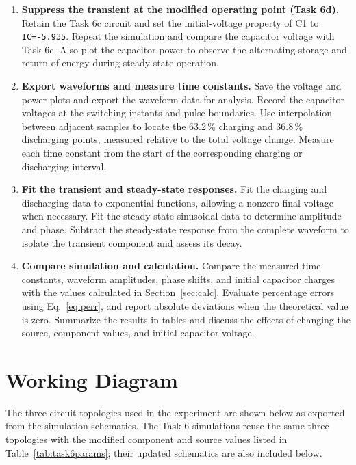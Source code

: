 \documentclass[12pt,a4paper]{article}
\begin{document}
\begin{enumerate}[label=\arabic*., leftmargin=2.5em, itemsep=6pt]
		\item \textbf{Suppress the transient at the modified operating
			point (Task 6d).}
		Retain the Task 6c circuit and set the initial-voltage property
		of C1 to \texttt{IC=-5.935}.  Repeat the simulation and
		compare the capacitor voltage with Task 6c.  Also plot the
		capacitor power to observe the alternating storage and return
		of energy during steady-state operation.
		
		\item \textbf{Export waveforms and measure time constants.}
		Save the voltage and power plots and export the waveform data
		for analysis.  Record the capacitor voltages at the switching
		instants and pulse boundaries.  Use interpolation between
		adjacent samples to locate the 63.2\,\% charging and
		36.8\,\% discharging points, measured relative to the total
		voltage change.  Measure each time constant from the start of
		the corresponding charging or discharging interval.
		
		\item \textbf{Fit the transient and steady-state responses.}
		Fit the charging and discharging data to exponential functions,
		allowing a nonzero final voltage when necessary.  Fit the
		steady-state sinusoidal data to determine amplitude and phase.
		Subtract the steady-state response from the complete waveform
		to isolate the transient component and assess its decay.
		
		\item \textbf{Compare simulation and calculation.}
		Compare the measured time constants, waveform amplitudes,
		phase shifts, and initial capacitor charges with the values
		calculated in Section~\ref{sec:calc}.  Evaluate percentage
		errors using Eq.~\eqref{eq:perr}, and report absolute
		deviations when the theoretical value is zero.  Summarize the
		results in tables and discuss the effects of changing the
		source, component values, and initial capacitor voltage.
	\end{enumerate}
	
	\section{Working Diagram}
	The three circuit topologies used in the experiment are shown below as
	exported from the simulation schematics.  The Task 6 simulations reuse
	the same three topologies with the modified component and source
	values listed in Table~\ref{tab:task6params}; their updated schematics
	are also included below.
	
\end{document}
